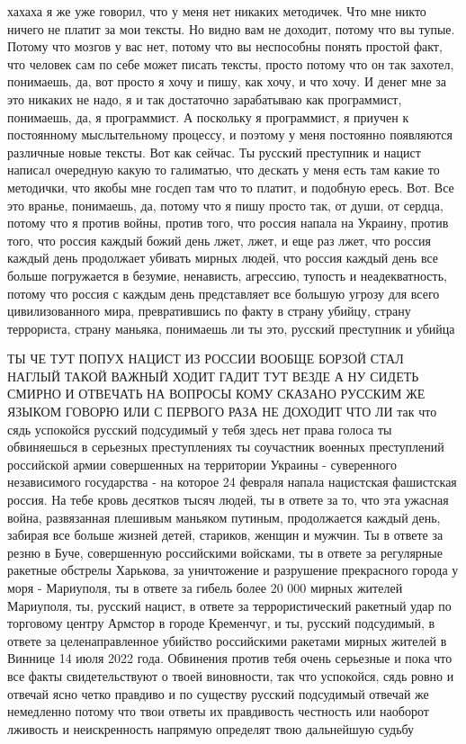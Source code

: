хахаха я же уже говорил, что у меня нет никаких методичек. Что мне никто ничего
не платит за мои тексты. Но видно вам не доходит, потому что вы тупые. Потому
что мозгов у вас нет, потому что вы неспособны понять простой факт, что человек
сам по себе может писать тексты, просто потому что он так захотел, понимаешь,
да, вот просто я хочу и пишу, как хочу, и что хочу. И денег мне за это никаких
не надо, я и так достаточно зарабатываю как программист, понимаешь, да, я
программист. А поскольку я программист, я приучен к постоянному мыслытельному
процессу, и поэтому у меня постоянно появляются различные новые тексты. Вот как
сейчас. Ты русский преступник и нацист написал очередную какую то галиматью,
что дескать у меня есть там какие то методички, что якобы мне госдеп там что то
платит, и подобную ересь. Вот. Все это вранье, понимаешь, да, потому что я пишу
просто так, от души, от сердца, потому что я против войны, против того, что
россия напала на Украину, против того, что россия каждый божий день лжет, лжет,
и еще раз лжет, что россия каждый день продолжает убивать мирных людей, что
россия каждый день все больше погружается в безумие, ненависть, агрессию,
тупость и неадекватность, потому что россия с каждым день представляет все
большую угрозу для всего цивилизованного мира, превратившись по факту в страну
убийцу, страну террориста, страну маньяка, понимаешь ли ты это, русский
преступник и убийца

ТЫ ЧЕ ТУТ ПОПУХ НАЦИСТ ИЗ РОССИИ ВООБЩЕ БОРЗОЙ СТАЛ НАГЛЫЙ ТАКОЙ ВАЖНЫЙ ХОДИТ
ГАДИТ ТУТ ВЕЗДЕ А НУ СИДЕТЬ СМИРНО И ОТВЕЧАТЬ НА ВОПРОСЫ КОМУ СКАЗАНО РУССКИМ
ЖЕ ЯЗЫКОМ ГОВОРЮ ИЛИ С ПЕРВОГО РАЗА НЕ ДОХОДИТ ЧТО ЛИ так что сядь успокойся
русский подсудимый у тебя здесь нет права голоса ты обвиняешься в серьезных
преступлениях ты соучастник военных преступлений российской армии совершенных
на территории Украины - суверенного независимого государства - на которое 24
февраля напала нацистская фашистская россия. На тебе кровь десятков тысяч
людей, ты в ответе за то, что эта ужасная война, развязанная плешивым маньяком
путиным, продолжается каждый день, забирая все больше жизней детей, стариков,
женщин и мужчин.  Ты в ответе за резню в Буче, совершенную российскими
войсками, ты в ответе за регулярные ракетные обстрелы Харькова, за уничтожение
и разрушение прекрасного города у моря - Мариуполя, ты в ответе за гибель более
20 000 мирных жителей Мариуполя, ты, русский нацист, в ответе за
террористический ракетный удар по торговому центру Армстор в городе Кременчуг,
и ты, русский подсудимый, в ответе за целенаправленное убийство российскими
ракетами мирных жителей в Виннице 14 июля 2022 года. Обвинения против тебя
очень серьезные и пока что все факты свидетельствуют о твоей виновности, так
что успокойся, сядь ровно и отвечай ясно четко правдиво и по существу русский
подсудимый отвечай же немедленно потому что твои ответы их правдивость
честность или наоборот лживость и неискренность напрямую определят твою
дальнейшую судьбу

